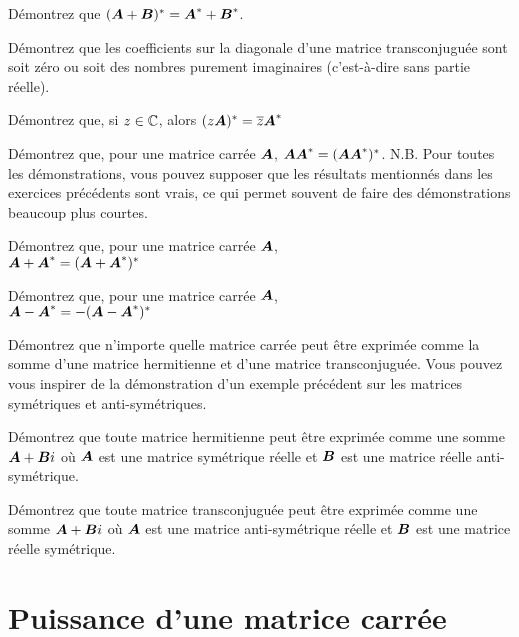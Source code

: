 \begin{exerciceC}
Démontrez que $(\boldsymbol{A}+\boldsymbol{B})^* = \boldsymbol{A}^* + \boldsymbol{B}^*$.
\end{exerciceC}
\begin{exerciceC}
Démontrez que les coefficients sur la diagonale d'une matrice transconjuguée
sont soit zéro ou soit des nombres purement imaginaires (c'est-à-dire sans
partie réelle).
\end{exerciceC}
\begin{exerciceC}
Démontrez que, si $z\in\mathbb{C}$, alors $(z\boldsymbol{A})^* = \overline{z}\boldsymbol{A}^*$
\end{exerciceC}
\begin{exerciceC}
Démontrez que, pour une matrice carrée $\boldsymbol{A}$,  $\boldsymbol{A}\boldsymbol{A}^* = (\boldsymbol{A}\boldsymbol{A}^*)^*$.
N.B. Pour toutes les démonstrations, vous pouvez supposer que les résultats mentionnés
dans les exercices précédents sont vrais, ce qui permet souvent de faire des démonstrations
beaucoup plus courtes.
\end{exerciceC}
\begin{exerciceC}
Démontrez que, pour une matrice carrée $\boldsymbol{A}$,  \\
$\boldsymbol{A}+\boldsymbol{A}^* = (\boldsymbol{A}+\boldsymbol{A}^*)^*$
\end{exerciceC}
\begin{exerciceC}
Démontrez que, pour une matrice carrée $\boldsymbol{A}$, \\
 $\boldsymbol{A}-\boldsymbol{A}^* = -(\boldsymbol{A}-\boldsymbol{A}^*)^*$
\end{exerciceC}
\begin{exerciceC}
Démontrez que n'importe quelle matrice carrée peut être exprimée comme la somme
d'une matrice hermitienne et d'une matrice transconjuguée.
\suggestion Vous pouvez vous inspirer de la démonstration d'un exemple précédent sur les
matrices symétriques et anti-symétriques.
\end{exerciceC}
\begin{exerciceC}
Démontrez que toute matrice hermitienne peut être exprimée comme une somme $\boldsymbol{A} + \boldsymbol{B} i$
où $\boldsymbol{A}$ est une matrice symétrique réelle et $\boldsymbol{B}$ est une matrice réelle anti-symétrique.
\end{exerciceC}
\begin{exerciceC}
Démontrez que toute matrice transconjuguée peut être exprimée comme une somme $\boldsymbol{A} + \boldsymbol{B} i$
où $\boldsymbol{A}$ est une matrice anti-symétrique réelle et $\boldsymbol{B}$ est une matrice réelle symétrique.
\end{exerciceC}


 \section{Puissance d'une matrice carrée}
 
